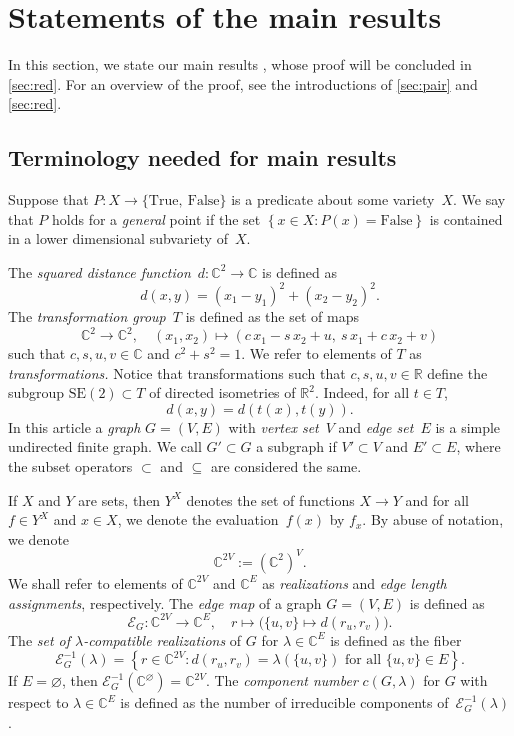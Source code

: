 \documentclass[12pt]{article}
\theoremstyle{definition}
\newcommand{\SEC}[1]{\textsection\ref{sec:#1}}
\newcommand{\df}[1]{{\it #1}}
\newcommand{\resp}{respectively}
\newcommand{\st}{such that }
\newcommand{\wrt}{with respect to }
\renewcommand{\c}{\colon}
\newcommand{\set}[2]{\left\{#1:#2\right\}}
\newcommand{\C}{{\mathbb{C}}}
\newcommand{\R}{{\mathbb{R}}}
\newcommand{\cE}{\mathcal{E}}
\newcommand{\SE}{\mathrm{SE}(2)}
\newcommand{\sd}{d} %
\begin{document}
\section{Statements of the main results}
\label{sec:main}

In this section, we state our main results ,
whose proof will be concluded in \SEC{red}.
For an overview of the proof, see the introductions of \SEC{pair} and \SEC{red}.

\subsection*{Terminology needed for main results}
Suppose that $P\c X\to \{\text{True},~\text{False}\}$ is a predicate about some variety~$X$.
We say that $P$ holds for a \df{general} point if
the set $\set{x\in X}{P(x)=\text{False}}$ is contained in a lower dimensional subvariety of~$X$.

The \df{squared distance function}~$d\c\C^2\to \C$ is defined as
\[
\sd(x,y)=(x_1-y_1)^2+(x_2-y_2)^2.
\]
The \df{transformation group}~$T$ is defined as the set of maps
\[
\C^2\to\C^2,\quad (x_1,x_2) \mapsto (c\,x_1-s\,x_2+u,~ s\,x_1+c\,x_2+v)
\]
\st $c,s,u,v\in\C$ and $c^2+s^2=1$.
We refer to elements of $T$ as \df{transformations.}
Notice that transformations \st $c,s,u,v\in\R$ define
the subgroup $\SE\subset T$ of directed isometries of $\R^2$.
Indeed, for all $t\in T$,
\[
\sd(x,y)=\sd(t(x),t(y)).
\]
In this article a \df{graph} $G=(V,E)$ with \df{vertex set}~$V$ and \df{edge set}~$E$
is a simple undirected finite graph.
We call $G'\subset G$ a subgraph if $V'\subset V$ and $E'\subset E$,
where the subset operators $\subset$ and $\subseteq$ are considered the same.

If $X$ and $Y$ are sets, then $Y^X$ denotes the set of functions $X\to Y$ and
for all $f\in Y^X$ and $x\in X$, we denote the evaluation~$f(x)$ by $f_x$.
By abuse of notation, we denote
\[
\C^{2V}:=(\C^2)^{V}.
\]
We shall refer to elements of $\C^{2V}$ and $\C^E$ as \df{realizations} and \df{edge length assignments}, \resp.
The \df{edge map} of a graph $G=(V,E)$ is defined as
\[
\cE_G\c \C^{2V}\to\C^E,\quad r\mapsto \bigl(\{u,v\}\mapsto d(r_u,r_v)\bigr).
\]
The \df{set of $\lambda$-compatible realizations} of $G$ for $\lambda\in \C^E$ is defined as the fiber
\[
\cE_G^{-1}(\lambda)=\set{r\in \C^{2V}}{\sd(r_u,r_v)=\lambda(\{u,v\}) \text{ for all }\{u,v\}\in E}.
\]
If $E=\varnothing$, then $\cE_G^{-1}(\C^\varnothing)=\C^{2V}$.
The \df{component number} $c(G,\lambda)$ for $G$ \wrt $\lambda\in\C^E$
is defined as the number of irreducible components of~$\cE_G^{-1}(\lambda)$.
\end{document}
